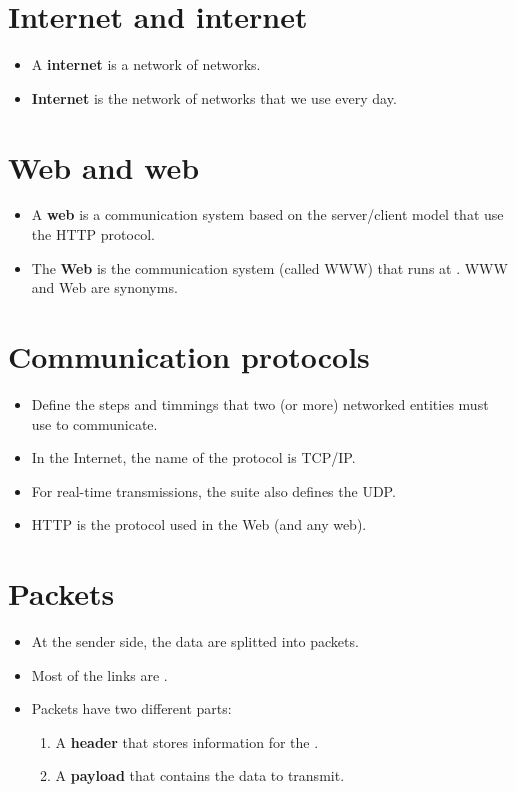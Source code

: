 \section{Internet and internet}
\begin{itemize}
\item A \textbf{internet} is a network of networks.
\item \textbf{Internet} is the network of networks that we use every day.
\end{itemize}

\section{Web and web}
\begin{itemize}
\item A \textbf{web} is a communication system based on the
server/client model that use the \gls{HTTP} protocol.
\item The \textbf{Web} is the communication system (called \gls{WWW})
that runs at . \gls{WWW} and Web are synonyms.
\end{itemize}

\section{Communication protocols}
\begin{itemize}
\item Define the steps and timmings that two (or more) networked
entities must use to communicate.
\item In the Internet, the name of the protocol  is \acrshort{TCP}/\acrshort{IP}.
\item For real-time transmissions, the suite also defines the
\gls{UDP}.
\item \gls{HTTP} is the protocol used in the Web (and any web).
\end{itemize}

\section{Packets}
\begin{itemize}
\item At the sender side, the data are splitted into packets.
\item Most of the links are .
\item Packets have two different parts:
\begin{enumerate}
\item A \textbf{header} that stores information for the .
\item A \textbf{payload} that contains the data to transmit.
\end{enumerate}
\end{itemize}